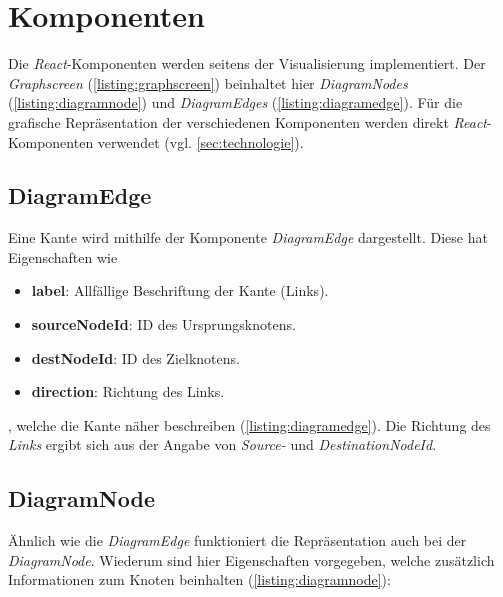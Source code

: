 
\section{Komponenten}\label{komponenten}

Die \textit{React}-Komponenten werden seitens der Visualisierung implementiert. Der \textit{Graphscreen} (\autoref{listing:graphscreen}) beinhaltet hier \textit{DiagramNodes} (\autoref{listing:diagramnode}) und \textit{DiagramEdges} (\autoref{listing:diagramedge}). Für die grafische Repräsentation der verschiedenen Komponenten werden direkt \textit{React}-Komponenten verwendet (vgl. \autoref{sec:technologie}).

\subsection{DiagramEdge}
Eine Kante wird mithilfe der Komponente \textit{DiagramEdge} dargestellt. Diese hat Eigenschaften wie 

\begin{itemize}
  \setlength\itemsep{1em}
    \item \textbf{label}: Allfällige Beschriftung der Kante (Links).
    \item \textbf{sourceNodeId}: ID des Ursprungsknotens.
    \item \textbf{destNodeId}: ID des Zielknotens.
    \item \textbf{direction}: Richtung des Links.
\end{itemize}

, welche die Kante näher beschreiben (\autoref{listing:diagramedge}). Die Richtung des \textit{Links} ergibt sich aus der Angabe von \textit{Source-} und \textit{DestinationNodeId}.


\subsection{DiagramNode}
Ähnlich wie die \textit{DiagramEdge} funktioniert die Repräsentation auch bei der \textit{DiagramNode}. Wiederum sind hier Eigenschaften vorgegeben, welche zusätzlich Informationen zum Knoten beinhalten (\autoref{listing:diagramnode}):

